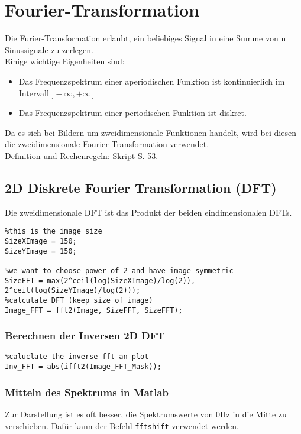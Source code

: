 \section{Fourier-Transformation}
Die Furier-Transformation erlaubt, ein beliebiges Signal in eine Summe von n Sinussignale zu zerlegen.\\
Einige wichtige Eigenheiten sind:
\begin{itemize}
    \item Das Frequenzspektrum einer aperiodischen Funktion ist kontinuierlich im Intervall $]-\infty , +\infty [$
    \item Das Frequenzspektrum einer periodischen Funktion ist diskret.
\end{itemize}
Da es sich bei Bildern um zweidimensionale Funktionen handelt, wird bei diesen die zweidimensionale Fourier-Transformation verwendet.\\
Definition und Rechenregeln: Skript S. 53.
\subsection{2D Diskrete Fourier Transformation (DFT)}
Die zweidimensionale DFT ist das Produkt der beiden eindimensionalen DFTs.
\begin{lstlisting}
%this is the image size
SizeXImage = 150;
SizeYImage = 150;

%we want to choose power of 2 and have image symmetric
SizeFFT = max(2^ceil(log(SizeXImage)/log(2)), 2^ceil(log(SizeYImage)/log(2)));
%calculate DFT (keep size of image)
Image_FFT = fft2(Image, SizeFFT, SizeFFT);
\end{lstlisting}

\subsubsection{Berechnen der Inversen 2D DFT}
\begin{lstlisting}
%caluclate the inverse fft an plot
Inv_FFT = abs(ifft2(Image_FFT_Mask));
\end{lstlisting}

\subsubsection{Mitteln des Spektrums in Matlab}
Zur Darstellung ist es oft besser, die Spektrumswerte von 0Hz in die Mitte zu verschieben. Dafür kann der Befehl \lstinline|fftshift| verwendet werden.

